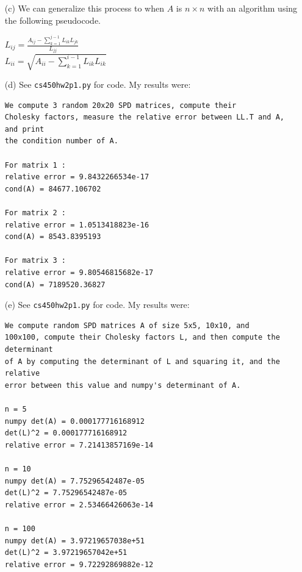 \documentclass[10pt]{article}
\begin{document}
\begin{enumerate}[(a)]
\item[(c)] We can generalize this process to when $A$ is $n \times n$ with an algorithm using the following pseudocode. 

\begin{algorithmic}
     $ L_{ij} = \frac{A_{ij} - \sum_{k = 1}^{j - 1} L_{ik} L_{jk}}{L_{jj}} $
    \EndFor \\
$L_{ii} = \sqrt{ A_{ii} - \sum_{k = 1}^{i - 1} L_{ik} L_{ik}  } $
\EndFor
\end{algorithmic}

\item[(d)] See \verb+cs450hw2p1.py+ for code. My results were:

\begin{verbatim}
We compute 3 random 20x20 SPD matrices, compute their
Cholesky factors, measure the relative error between LL.T and A, and print
the condition number of A.

For matrix 1 :
relative error = 9.8432266534e-17
cond(A) = 84677.106702

For matrix 2 :
relative error = 1.0513418823e-16
cond(A) = 8543.8395193

For matrix 3 :
relative error = 9.80546815682e-17
cond(A) = 7189520.36827
\end{verbatim}

\item[(e)] See \verb+cs450hw2p1.py+ for code. My results were:

\begin{verbatim}
We compute random SPD matrices A of size 5x5, 10x10, and
100x100, compute their Cholesky factors L, and then compute the determinant
of A by computing the determinant of L and squaring it, and the relative
error between this value and numpy's determinant of A.

n = 5
numpy det(A) = 0.000177716168912
det(L)^2 = 0.000177716168912
relative error = 7.21413857169e-14

n = 10
numpy det(A) = 7.75296542487e-05
det(L)^2 = 7.75296542487e-05
relative error = 2.53466426063e-14

n = 100
numpy det(A) = 3.97219657038e+51
det(L)^2 = 3.97219657042e+51
relative error = 9.72292869882e-12

\end{verbatim}

\end{enumerate}


\end{document}
